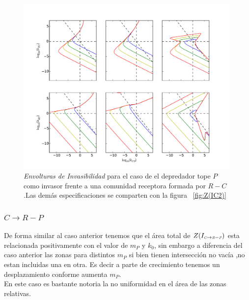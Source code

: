 \begin{figure}
  \centering
  \includegraphics[width = 0.99\textwidth]{./Plots/Z(IC4)AcGrGr.pdf}
  \caption[Env $Z(IC4)$]{\emph{Envolturas de Invasibilidad} para el caso de el depredador tope $P$ como invasor frente a una comunidad receptora formada por $R-C$ .Las dem\'as especificaciones se comparten con la figura ~\ref{fig:Z(IC2)}}
  \label{fig:Z(IC4)}
\end{figure}

\subsubsection{$C \to R-P$}
De forma similar al caso anterior tenemos que el \'area total de $Z(I_{\textit{\tiny C} \to \textit{\tiny R} - \textit{\tiny P}})$ esta relacionada positivamente con el valor de $m_P$ y $k_0$, sin embargo a diferencia del caso anterior las zonas para distintos $m_P$ si bien tienen intersecci\'on no vac\'ia ,no estan incluidas una en otra. Es decir a parte de crecimiento tenemos un desplazamiento conforme aumenta $m_P$. \\

En este caso es bastante notoria la no uniformidad en el \'area de las zonas relativas.\\

